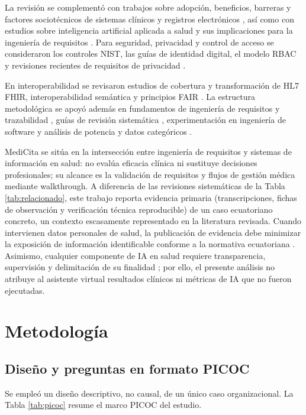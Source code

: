 \documentclass[runningheads]{llncs}
\begin{document}
	La revisión se complementó con trabajos sobre adopción, beneficios, barreras y factores sociotécnicos de sistemas clínicos y registros electrónicos \cite{menachemi2011,buntin2011,kruse2016,gagnon2012,carayon2014,sittig2010,holden2010}, así como con estudios sobre inteligencia artificial aplicada a salud y sus implicaciones para la ingeniería de requisitos \cite{topol2019,rajkomar2019,ahmad2023,habiba2024}. Para seguridad, privacidad y control de acceso se consideraron los controles NIST, las guías de identidad digital, el modelo RBAC y revisiones recientes de requisitos de privacidad \cite{nist80053,nist80063,sandhu2000,negriribalta2024,herwanto2024}.
	
	En interoperabilidad se revisaron estudios de cobertura y transformación de HL7 FHIR, interoperabilidad semántica y principios FAIR \cite{bikkanuri2024,smartfhir2024,fhirchronic2024,bossenko2024,jamiafair2024,jmirfhir2024,fhirpipeline2025}. La estructura metodológica se apoyó además en fundamentos de ingeniería de requisitos y trazabilidad \cite{nuseibeh2000,clelandhuang2003,chung2000}, guías de revisión sistemática \cite{kitchenham2009,petersen2015}, experimentación en ingeniería de software \cite{wohlin2012} y análisis de potencia y datos categóricos \cite{faul2007,agresti2007}.
	
	MediCita se sitúa en la intersección entre ingeniería de requisitos y sistemas de información en salud: no evalúa eficacia clínica ni sustituye decisiones profesionales; su alcance es la validación de requisitos y flujos de gestión médica mediante walkthrough. A diferencia de las revisiones sistemáticas de la Tabla \ref{tab:relacionado}, este trabajo reporta evidencia primaria (transcripciones, fichas de observación y verificación técnica reproducible) de un caso ecuatoriano concreto, un contexto escasamente representado en la literatura revisada. Cuando intervienen datos personales de salud, la publicación de evidencia debe minimizar la exposición de información identificable conforme a la normativa ecuatoriana \cite{loppd}. Asimismo, cualquier componente de IA en salud requiere transparencia, supervisión y delimitación de su finalidad \cite{whoai2021}; por ello, el presente análisis no atribuye al asistente virtual resultados clínicos ni métricas de IA que no fueron ejecutadas.
	
	\section{Metodología}
	\subsection{Diseño y preguntas en formato PICOC}
	Se empleó un diseño descriptivo, no causal, de un único caso organizacional. La Tabla \ref{tab:picoc} resume el marco PICOC del estudio.
	
\end{document}
